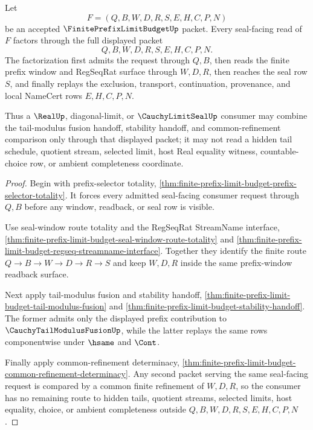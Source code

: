 \begin{theorem}
\label{thm:finite-prefix-limit-budget-seal-read-factorization}
Let
$$
F=(Q,B,W,D,R,S,E,H,C,P,N)
$$
be an accepted $\FinitePrefixLimitBudgetUp$ packet. Every seal-facing read of $F$ factors through the full displayed packet
$$
Q,B,W,D,R,S,E,H,C,P,N.
$$
The factorization first admits the request through $Q,B$, then reads the finite prefix window and RegSeqRat surface through $W,D,R$, then reaches the seal row $S$, and finally replays the exclusion, transport, continuation, provenance, and local NameCert rows $E,H,C,P,N$.

Thus a $\RealUp$, diagonal-limit, or $\CauchyLimitSealUp$ consumer may combine the tail-modulus fusion handoff, stability handoff, and common-refinement comparison only through that displayed packet; it may not read a hidden tail schedule, quotient stream, selected limit, host Real equality witness, countable-choice row, or ambient completeness coordinate.
\end{theorem}
\begin{proof}
Begin with prefix-selector totality, \autoref{thm:finite-prefix-limit-budget-prefix-selector-totality}. It forces every admitted seal-facing consumer request through $Q,B$ before any window, readback, or seal row is visible.

Use seal-window route totality and the RegSeqRat StreamName interface, \autoref{thm:finite-prefix-limit-budget-seal-window-route-totality} and \autoref{thm:finite-prefix-limit-budget-regseq-streamname-interface}. Together they identify the finite route $Q \to B \to W \to D \to R \to S$ and keep $W,D,R$ inside the same prefix-window readback surface.

Next apply tail-modulus fusion and stability handoff, \autoref{thm:finite-prefix-limit-budget-tail-modulus-fusion} and \autoref{thm:finite-prefix-limit-budget-stability-handoff}. The former admits only the displayed prefix contribution to $\CauchyTailModulusFusionUp$, while the latter replays the same rows componentwise under $\hsame$ and $\Cont$.

Finally apply common-refinement determinacy, \autoref{thm:finite-prefix-limit-budget-common-refinement-determinacy}. Any second packet serving the same seal-facing request is compared by a common finite refinement of $W,D,R$, so the consumer has no remaining route to hidden tails, quotient streams, selected limits, host equality, choice, or ambient completeness outside $Q,B,W,D,R,S,E,H,C,P,N$.
\end{proof}

